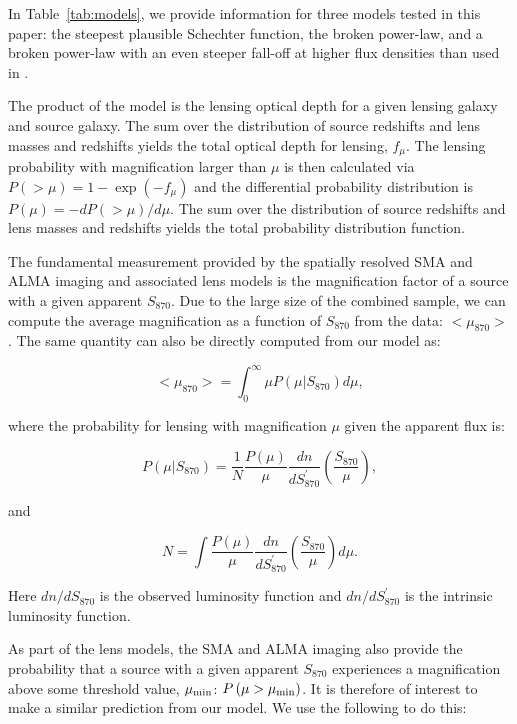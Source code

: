\documentclass[iop]{emulateapj}
\begin{document}
In Table~\ref{tab:models}, we provide information for three models tested in
this paper: the steepest plausible Schechter function, the \citet{Karim:2013lr}
broken power-law, and a broken power-law with an even steeper fall-off at
higher flux densities than used in \citet{Karim:2013lr}.



The product of the model is the lensing optical depth for a given lensing galaxy
and source galaxy. The sum over the distribution of source redshifts and lens
masses and redshifts yields the total optical depth for lensing,  $f_\mu$. The
lensing probability with magnification larger than $\mu$ is then calculated via
$P(>\mu) = 1-\exp(-f_\mu)$ and the differential probability distribution is
$P(\mu) = -dP(>\mu)/d\mu$.  The sum over the distribution of source redshifts
and lens masses and redshifts yields the total probability distribution
function.

The fundamental measurement provided by the spatially resolved SMA and ALMA
imaging and associated lens models is the magnification factor of a source with
a given apparent $S_{870}$.  Due to the large size of the combined sample, we
can compute the average magnification as a function of $S_{870}$ from the data:
$<\mu_{870}>$.  The same quantity can also be directly computed from our
model as: 

\begin{equation}
    <\mu_{870}> = \int_0^\infty \mu P(\mu|S_{870})  d\mu,
 \end{equation}

\noindent where the probability for lensing with magnification $\mu$ given the
apparent flux is:

\begin{equation}
    P(\mu|S_{870}) = \frac{1}{N} \frac{P(\mu)}{\mu} \frac{dn}{dS_{870}^\prime}
\left(\frac{S_{870}}{\mu}\right),
\end{equation} 

\noindent and 

\begin{equation}
    N = \int \frac{P(\mu)}{\mu} \frac{dn}{dS_{870}^\prime}
    \left(\frac{S_{870}}{\mu}\right)d\mu.
\end{equation}

\noindent Here $ dn/dS_{870}$ is the observed luminosity function and
$dn/dS_{870}^\prime$ is the intrinsic luminosity function.

As part of the lens models, the SMA and ALMA imaging also provide the
probability that a source with a given apparent $S_{870}$ experiences a
magnification above some threshold value, $\mu_{\rm min}$: $P\,(\mu > \mu_{\rm
min})$.  It is therefore of interest to make a similar prediction from our
model.  We use the following to do this:
\end{document}
